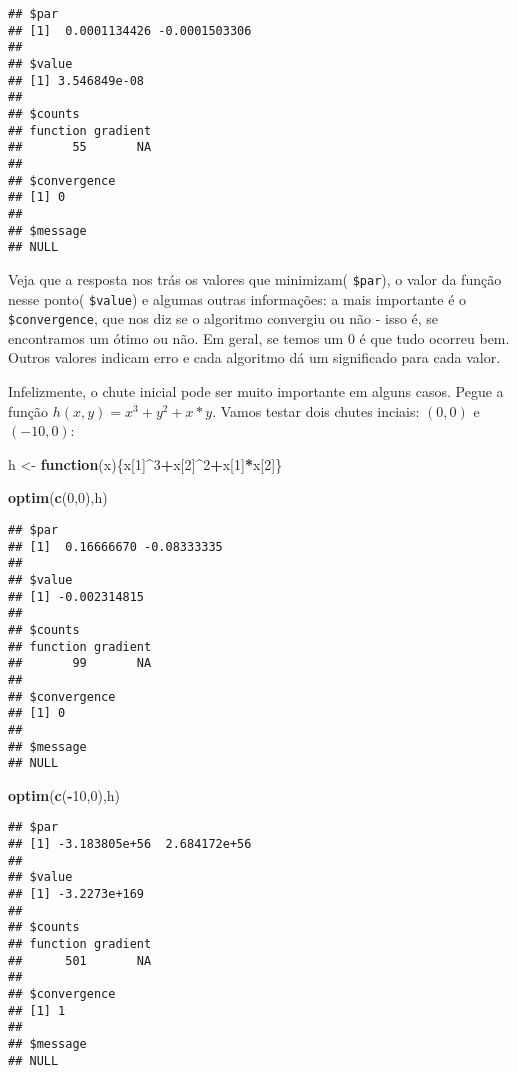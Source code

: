 \documentclass[]{book}
\newenvironment{Shaded}{\begin{snugshade}}{\end{snugshade}}
\newcommand{\KeywordTok}[1]{\textcolor[rgb]{0.13,0.29,0.53}{\textbf{#1}}}
\newcommand{\DecValTok}[1]{\textcolor[rgb]{0.00,0.00,0.81}{#1}}
\newcommand{\StringTok}[1]{\textcolor[rgb]{0.31,0.60,0.02}{#1}}
\newcommand{\ControlFlowTok}[1]{\textcolor[rgb]{0.13,0.29,0.53}{\textbf{#1}}}
\newcommand{\OperatorTok}[1]{\textcolor[rgb]{0.81,0.36,0.00}{\textbf{#1}}}
\newcommand{\NormalTok}[1]{#1}
\begin{document}
\begin{verbatim}
## $par
## [1]  0.0001134426 -0.0001503306
## 
## $value
## [1] 3.546849e-08
## 
## $counts
## function gradient 
##       55       NA 
## 
## $convergence
## [1] 0
## 
## $message
## NULL
\end{verbatim}

Veja que a resposta nos trás os valores que minimizam( \texttt{\$par}),
o valor da função nesse ponto( \texttt{\$value}) e algumas outras
informações: a mais importante é o \texttt{\$convergence}, que nos diz
se o algoritmo convergiu ou não - isso é, se encontramos um ótimo ou
não. Em geral, se temos um 0 é que tudo ocorreu bem. Outros valores
indicam erro e cada algoritmo dá um significado para cada valor.

Infelizmente, o chute inicial pode ser muito importante em alguns casos.
Pegue a função \(h(x,y)=x^3+y^2+x*y\). Vamos testar dois chutes inciais:
\((0,0)\) e \((-10,0)\):

\begin{Shaded}
\begin{Highlighting}[]
\NormalTok{h <-}\StringTok{ }\ControlFlowTok{function}\NormalTok{(x)\{x[}\DecValTok{1}\NormalTok{]}\OperatorTok{^}\DecValTok{3}\OperatorTok{+}\NormalTok{x[}\DecValTok{2}\NormalTok{]}\OperatorTok{^}\DecValTok{2}\OperatorTok{+}\NormalTok{x[}\DecValTok{1}\NormalTok{]}\OperatorTok{*}\NormalTok{x[}\DecValTok{2}\NormalTok{]\}}

\KeywordTok{optim}\NormalTok{(}\KeywordTok{c}\NormalTok{(}\DecValTok{0}\NormalTok{,}\DecValTok{0}\NormalTok{),h)}
\end{Highlighting}
\end{Shaded}

\begin{verbatim}
## $par
## [1]  0.16666670 -0.08333335
## 
## $value
## [1] -0.002314815
## 
## $counts
## function gradient 
##       99       NA 
## 
## $convergence
## [1] 0
## 
## $message
## NULL
\end{verbatim}

\begin{Shaded}
\begin{Highlighting}[]
\KeywordTok{optim}\NormalTok{(}\KeywordTok{c}\NormalTok{(}\OperatorTok{-}\DecValTok{10}\NormalTok{,}\DecValTok{0}\NormalTok{),h)  }
\end{Highlighting}
\end{Shaded}

\begin{verbatim}
## $par
## [1] -3.183805e+56  2.684172e+56
## 
## $value
## [1] -3.2273e+169
## 
## $counts
## function gradient 
##      501       NA 
## 
## $convergence
## [1] 1
## 
## $message
## NULL
\end{verbatim}
\end{document}
